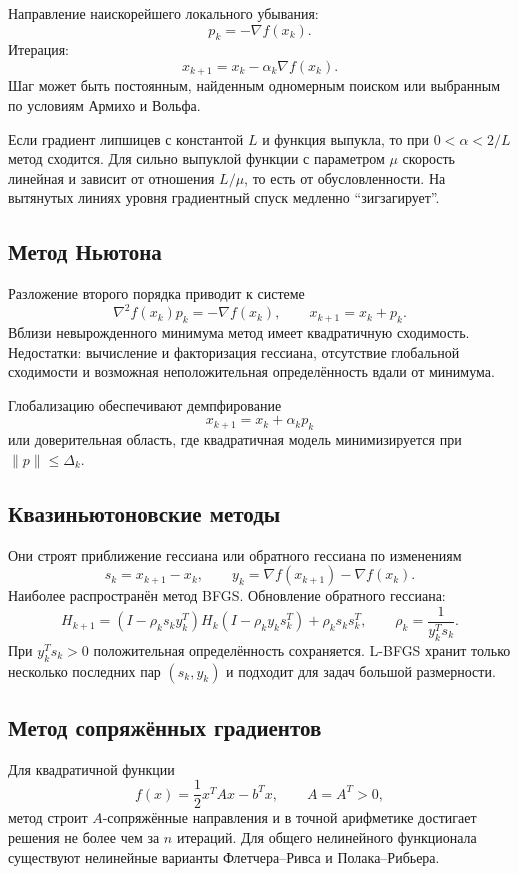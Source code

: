 Направление наискорейшего локального убывания:
\[
    p_k=-\nabla f(x_k).
\]
Итерация:
\[
    x_{k+1}=x_k-\alpha_k\nabla f(x_k).
\]
Шаг может быть постоянным, найденным одномерным поиском или выбранным по
условиям Армихо и Вольфа.

Если градиент липшицев с константой $L$ и функция выпукла, то при
$0<\alpha<2/L$ метод сходится. Для сильно выпуклой функции с параметром $\mu$
скорость линейная и зависит от отношения $L/\mu$, то есть от обусловленности.
На вытянутых линиях уровня градиентный спуск медленно ``зигзагирует''.

\subsection{Метод Ньютона}

Разложение второго порядка приводит к системе
\[
    \nabla^2 f(x_k)p_k=-\nabla f(x_k),
    \qquad
    x_{k+1}=x_k+p_k.
\]
Вблизи невырожденного минимума метод имеет квадратичную сходимость. Недостатки:
вычисление и факторизация гессиана, отсутствие глобальной сходимости и возможная
неположительная определённость вдали от минимума.

Глобализацию обеспечивают демпфирование
\[
    x_{k+1}=x_k+\alpha_kp_k
\]
или доверительная область, где квадратичная модель минимизируется при
$\|p\|\leq\Delta_k$.

\subsection{Квазиньютоновские методы}

Они строят приближение гессиана или обратного гессиана по изменениям
\[
    s_k=x_{k+1}-x_k,
    \qquad
    y_k=\nabla f(x_{k+1})-\nabla f(x_k).
\]
Наиболее распространён метод BFGS. Обновление обратного гессиана:
\[
H_{k+1}=
(I-\rho_ks_ky_k^T)H_k(I-\rho_ky_ks_k^T)
+\rho_ks_ks_k^T,
\qquad
\rho_k=\frac1{y_k^Ts_k}.
\]
При $y_k^Ts_k>0$ положительная определённость сохраняется. L-BFGS хранит только
несколько последних пар $(s_k,y_k)$ и подходит для задач большой размерности.

\subsection{Метод сопряжённых градиентов}

Для квадратичной функции
\[
    f(x)=\frac12x^TAx-b^Tx,
    \qquad A=A^T>0,
\]
метод строит $A$-сопряжённые направления и в точной арифметике достигает решения
не более чем за $n$ итераций. Для общего нелинейного функционала существуют
нелинейные варианты Флетчера--Ривса и Полака--Рибьера.

